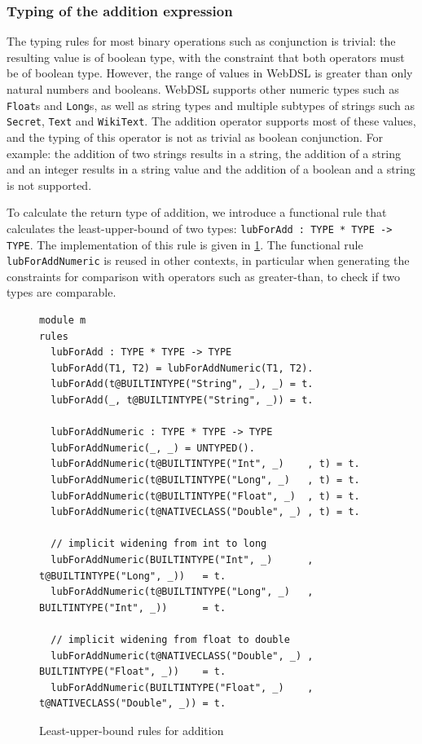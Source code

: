      \subsubsection{Typing of the addition expression}

        The typing rules for most binary operations such as conjunction is trivial: the resulting value is of boolean type, with the constraint that both operators must be of boolean type. However, the range of values in WebDSL is greater than only natural numbers and booleans. WebDSL supports other numeric types such as \texttt{Float}s and \texttt{Long}s, as well as string types and multiple subtypes of strings such as \texttt{Secret}, \texttt{Text} and \texttt{WikiText}. The addition operator supports most of these values, and the typing of this operator is not as trivial as boolean conjunction. For example: the addition of two strings results in a string, the addition of a string and an integer results in a string value and the addition of a boolean and a string is not supported.

        To calculate the return type of addition, we introduce a functional rule that calculates the least-upper-bound of two types: \texttt{lubForAdd : TYPE * TYPE -> TYPE}. The implementation of this rule is given in \cref{fig:least-upper-bound-for-addition}. The functional rule \texttt{lubForAddNumeric} is reused in other contexts, in particular when generating the constraints for comparison with operators such as greater-than, to check if two types are comparable.

        \begin{figure}
          \begin{verbatim}
module m
rules
  lubForAdd : TYPE * TYPE -> TYPE
  lubForAdd(T1, T2) = lubForAddNumeric(T1, T2).
  lubForAdd(t@BUILTINTYPE("String", _), _) = t.
  lubForAdd(_, t@BUILTINTYPE("String", _)) = t.

  lubForAddNumeric : TYPE * TYPE -> TYPE
  lubForAddNumeric(_, _) = UNTYPED().
  lubForAddNumeric(t@BUILTINTYPE("Int", _)    , t) = t.
  lubForAddNumeric(t@BUILTINTYPE("Long", _)   , t) = t.
  lubForAddNumeric(t@BUILTINTYPE("Float", _)  , t) = t.
  lubForAddNumeric(t@NATIVECLASS("Double", _) , t) = t.

  // implicit widening from int to long
  lubForAddNumeric(BUILTINTYPE("Int", _)      , t@BUILTINTYPE("Long", _))   = t.
  lubForAddNumeric(t@BUILTINTYPE("Long", _)   , BUILTINTYPE("Int", _))      = t.

  // implicit widening from float to double
  lubForAddNumeric(t@NATIVECLASS("Double", _) , BUILTINTYPE("Float", _))    = t.
  lubForAddNumeric(BUILTINTYPE("Float", _)    , t@NATIVECLASS("Double", _)) = t.
          \end{verbatim}
          \caption{\label{fig:least-upper-bound-for-addition}Least-upper-bound rules for addition}
        \end{figure}


